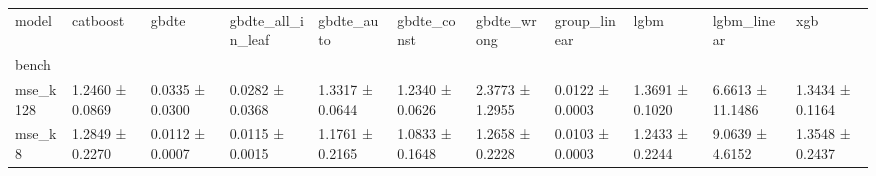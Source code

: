 \begin{tabular}{lllllllllll}
\toprule
model & catboost & gbdte & gbdte_all_in_leaf & gbdte_auto & gbdte_const & gbdte_wrong & group_linear & lgbm & lgbm_linear & xgb \\
bench &  &  &  &  &  &  &  &  &  &  \\
\midrule
mse_k128 & 1.2460 ± 0.0869 & 0.0335 ± 0.0300 & 0.0282 ± 0.0368 & 1.3317 ± 0.0644 & 1.2340 ± 0.0626 & 2.3773 ± 1.2955 & 0.0122 ± 0.0003 & 1.3691 ± 0.1020 & 6.6613 ± 11.1486 & 1.3434 ± 0.1164 \\
mse_k8 & 1.2849 ± 0.2270 & 0.0112 ± 0.0007 & 0.0115 ± 0.0015 & 1.1761 ± 0.2165 & 1.0833 ± 0.1648 & 1.2658 ± 0.2228 & 0.0103 ± 0.0003 & 1.2433 ± 0.2244 & 9.0639 ± 4.6152 & 1.3548 ± 0.2437 \\
\bottomrule
\end{tabular}
